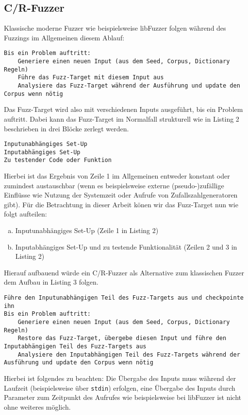 \documentclass[a4paper]{article}
\begin{document}
\subsection{C/R-Fuzzer}
Klassische moderne Fuzzer wie beispielsweise libFuzzer folgen während des Fuzzings im Allgemeinen diesem Ablauf:
\begin{lstlisting}[caption=Struktur klassischer Non-C/R-Fuzzer]
Bis ein Problem auftritt:
    Generiere einen neuen Input (aus dem Seed, Corpus, Dictionary Regeln)
    Führe das Fuzz-Target mit diesem Input aus
    Analysiere das Fuzz-Target während der Ausführung und update den Corpus wenn nötig
\end{lstlisting}
Das Fuzz-Target wird also mit verschiedenen Inputs ausgeführt, bis ein Problem auftritt. Dabei kann das Fuzz-Target im Normalfall strukturell wie in Listing 2 beschrieben in drei Blöcke zerlegt werden.
\begin{lstlisting}[caption=Struktur klassischen Fuzz-Targets]
Inputunabhängiges Set-Up
Inputabhängiges Set-Up
Zu testender Code oder Funktion
\end{lstlisting}
Hierbei ist das Ergebnis von Zeile 1 im Allgemeinen entweder konstant oder zumindest austauschbar (wenn es beispielsweise externe (pseudo-)zufällige Einflüsse wie Nutzung der Systemzeit oder Aufrufe von Zufallszahlgeneratoren gibt). Für die Betrachtung in dieser Arbeit könen wir das Fuzz-Target nun wie folgt aufteilen:
\begin{enumerate}[(a)]
    \item Inputunabhängiges Set-Up (Zeile 1 in Listing 2)
    \item Inputabhängiges Set-Up und zu testende Funktionalität (Zeilen 2 und 3 in Listing 2)
\end{enumerate}
Hierauf aufbauend würde ein C/R-Fuzzer als Alternative zum klassischen Fuzzer dem Aufbau in Listing 3 folgen.
\begin{lstlisting}[caption=Struktur einfacher C/R-Fuzzer]
Führe den Inputunabhängigen Teil des Fuzz-Targets aus und checkpointe ihn
Bis ein Problem auftritt:
    Generiere einen neuen Input (aus dem Seed, Corpus, Dictionary Regeln)
    Restore das Fuzz-Target, übergebe diesen Input und führe den Inputabhängigen Teil des Fuzz-Targets aus
    Analysiere den Inputabhängigen Teil des Fuzz-Targets während der Ausführung und update den Corpus wenn nötig
\end{lstlisting}
Hierbei ist folgendes zu beachten: 
Die Übergabe des Inputs muss während der Laufzeit (beispielsweise über \texttt{stdin}) erfolgen, eine Übergabe des Inputs durch Parameter zum Zeitpunkt des Aufrufes wie beispielsweise bei libFuzzer ist nicht ohne weiteres möglich. 
\end{document}
